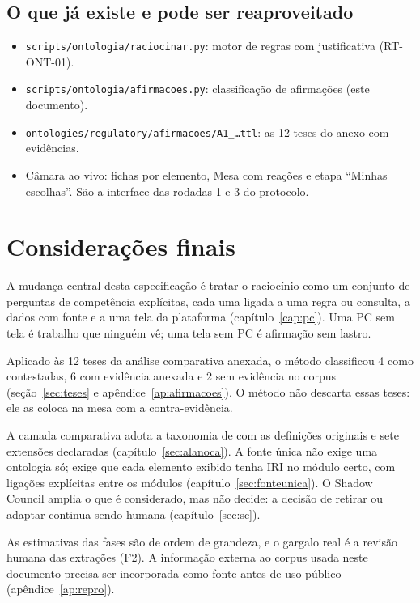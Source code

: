\documentclass[12pt,a4paper,oneside,english,brazil]{abntex2}
\begin{document}
\section{O que já existe e pode ser reaproveitado}
\begin{itemize}[leftmargin=*]
  \item \texttt{scripts/ontologia/raciocinar.py}: motor de regras com justificativa (RT-ONT-01).
  \item \texttt{scripts/ontologia/afirmacoes.py}: classificação de afirmações (este documento).
  \item \texttt{ontologies/regulatory/afirmacoes/A1\_\ldots ttl}: as 12 teses do anexo com evidências.
  \item Câmara ao vivo: fichas por elemento, Mesa com reações e etapa ``Minhas escolhas''. São a interface das rodadas 1 e 3 do protocolo.
\end{itemize}

\chapter{Considerações finais}\label{cap:final}

A mudança central desta especificação é tratar o raciocínio como um conjunto de perguntas de competência explícitas, cada uma ligada a uma regra ou consulta, a dados com fonte e a uma tela da plataforma (capítulo~\ref{cap:pc}). Uma PC sem tela é trabalho que ninguém vê; uma tela sem PC é afirmação sem lastro.

Aplicado às 12 teses da análise comparativa anexada, o método classificou 4 como contestadas, 6 com evidência anexada e 2 sem evidência no corpus (seção~\ref{sec:teses} e apêndice~\ref{ap:afirmacoes}). O método não descarta essas teses: ele as coloca na mesa com a contra-evidência.

A camada comparativa adota a taxonomia de  com as definições originais e sete extensões declaradas (capítulo~\ref{sec:alanoca}). A fonte única não exige uma ontologia só; exige que cada elemento exibido tenha IRI no módulo certo, com ligações explícitas entre os módulos (capítulo~\ref{sec:fonteunica}). O Shadow Council amplia o que é considerado, mas não decide: a decisão de retirar ou adaptar continua sendo humana (capítulo~\ref{sec:sc}).

As estimativas das fases são de ordem de grandeza, e o gargalo real é a revisão humana das extrações (F2). A informação externa ao corpus usada neste documento precisa ser incorporada como fonte antes de uso público (apêndice~\ref{ap:repro}).
\end{document}
